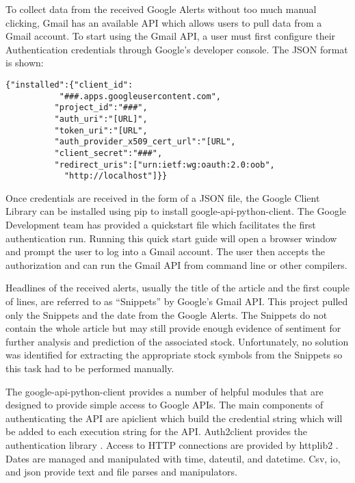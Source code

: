 \documentclass[sigconf]{acmart}
\begin{document}
To collect data from the received Google Alerts without too much manual clicking, Gmail has an available API which allows users to pull data from a Gmail account. To start using the Gmail API, a user must first configure their Authentication credentials through Google's developer console. The JSON format is shown:
\begin{verbatim}
{"installed":{"client_id":
		   "###.apps.googleusercontent.com",
		  "project_id":"###",
		  "auth_uri":"[URL]",
		  "token_uri":"[URL",
		  "auth_provider_x509_cert_url":"[URL",
		  "client_secret":"###",
		  "redirect_uris":["urn:ietf:wg:oauth:2.0:oob",
			"http://localhost"]}}
\end{verbatim}
Once credentials are received in the form of a JSON file, the Google Client Library can be installed using pip to install google-api-python-client. The Google Development team has provided a quickstart file which facilitates the first authentication run. Running this quick start guide will open a browser window and prompt the user to log into a Gmail account. The user then accepts the authorization and can run the Gmail API from command line or other compilers. 

 Headlines of the received alerts, usually the title of the article and the first couple of lines, are referred to as ``Snippets'' by Google's Gmail API. This project pulled only the Snippets and the date from the Google Alerts. The Snippets do not contain the whole article but may still provide enough evidence of sentiment for further analysis and prediction of the associated stock. Unfortunately, no solution was identified for extracting the appropriate stock symbols from the Snippets so this task had to be performed manually. 

The google-api-python-client provides a number of helpful modules that are designed to provide simple access to Google APIs. The main components of authenticating the API are apiclient which build the credential string which will be added to each execution string for the API. Auth2client provides the authentication library \cite{www-apiAccess}. Access to HTTP connections are provided by httplib2 \cite{www-http}. Dates are managed and manipulated with time, dateutil, and datetime. Csv, io, and json provide text and file parses and manipulators. 
\end{document}
